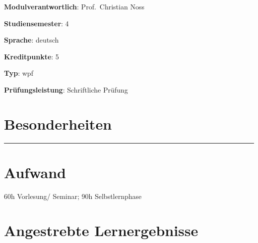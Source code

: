 \begin{modulHead}
\textbf{Modulverantwortlich}: Prof.~Christian
Noss
\end{modulHead}
\begin{modulHead}
\textbf{Studiensemester}:
4
\end{modulHead}
\begin{modulHead}
\textbf{Sprache}:
deutsch
\end{modulHead}
\begin{modulHead}
\textbf{Kreditpunkte}:
5
\end{modulHead}
\begin{modulHead}
\textbf{Typ}:
wpf
\end{modulHead}
\begin{modulHead}
\textbf{Prüfungsleistung}:
Schriftliche Prüfung
\end{modulHead}


\hypertarget{besonderheitenpathlabel....srcmodulbeschreibungen-bachelor-bpo5ba_frontend-development}{%
\section*{Besonderheiten\label{../../src/modulbeschreibungen-bachelor-bpo5/BA_Frontend-Development}}\label{besonderheitenpathlabel....srcmodulbeschreibungen-bachelor-bpo5ba_frontend-development}}

\begin{center}\rule{0.5\linewidth}{0.5pt}\end{center}

\hypertarget{aufwandpathlabel....srcmodulbeschreibungen-bachelor-bpo5ba_frontend-development}{%
\section*{Aufwand\label{../../src/modulbeschreibungen-bachelor-bpo5/BA_Frontend-Development}}\label{aufwandpathlabel....srcmodulbeschreibungen-bachelor-bpo5ba_frontend-development}}

60h Vorlesung/ Seminar; 90h Selbstlernphase

\hypertarget{angestrebte-lernergebnissepathlabel....srcmodulbeschreibungen-bachelor-bpo5ba_frontend-development}{%
\section*{Angestrebte
Lernergebnisse\label{../../src/modulbeschreibungen-bachelor-bpo5/BA_Frontend-Development}}\label{angestrebte-lernergebnissepathlabel....srcmodulbeschreibungen-bachelor-bpo5ba_frontend-development}}

